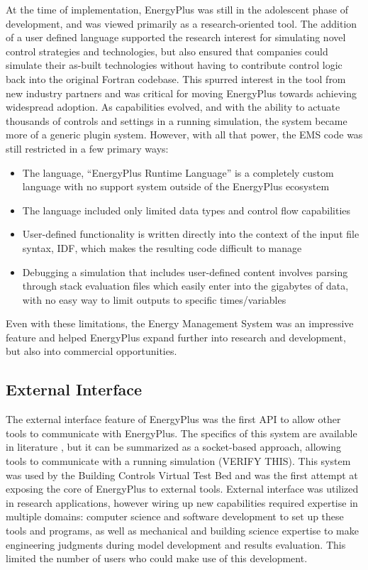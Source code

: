 \documentclass[5p, authoryear]{elsarticle}
\begin{document}
At the time of implementation, EnergyPlus was still in the adolescent phase of development, and was viewed primarily as a research-oriented tool.  
The addition of a user defined language supported the research interest for simulating novel control strategies and technologies, but also ensured that companies could simulate their as-built technologies without having to contribute control logic back into the original Fortran codebase.  
This spurred interest in the tool from new industry partners and was critical for moving EnergyPlus towards achieving widespread adoption.  
As capabilities evolved, and with the ability to actuate thousands of controls and settings in a running simulation, the system became more of a generic plugin system.  
However, with all that power, the EMS code was still restricted in a few primary ways:

\begin{itemize}
  \item The language, ``EnergyPlus Runtime Language'' is a completely custom language with no support system outside of the EnergyPlus ecosystem
  \item The language included only limited data types and control flow capabilities 
  \item User-defined functionality is written directly into the context of the input file syntax, IDF, which makes the resulting code difficult to manage
  \item Debugging a simulation that includes user-defined content involves parsing through stack evaluation files which easily enter into the gigabytes of data, with no easy way to limit outputs to specific times/variables
\end{itemize}

Even with these limitations, the Energy Management System was an impressive feature and helped EnergyPlus expand further into research and development, but also into commercial opportunities.

\subsection{External Interface}
The external interface feature of EnergyPlus was the first API to allow other tools to communicate with EnergyPlus.  
The specifics of this system are available in literature \citep{Nouidui2014}, but it can be summarized as a socket-based approach, allowing tools to communicate with a running simulation (VERIFY THIS).  
This system was used by the Building Controls Virtual Test Bed \citep{Pang2011} and was the first attempt at exposing the core of EnergyPlus to external tools.  
External interface was utilized in research applications, however wiring up new capabilities required expertise in multiple domains: computer science and software development to set up these tools and programs, as well as mechanical and building science expertise to make engineering judgments during model development and results evaluation.  
This limited the number of users who could make use of this development.
\end{document}
